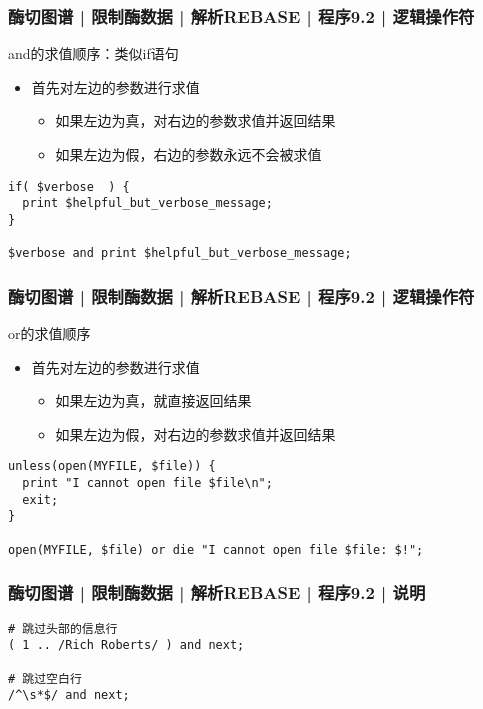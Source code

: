 \begin{frame}[fragile]
  \frametitle{酶切图谱 | 限制酶数据 | 解析REBASE | 程序9.2 | \alert{逻辑操作符}}
  \begin{block}{and的求值顺序：类似if语句}
    \begin{itemize}
      \item 首先对左边的参数进行求值
	\begin{itemize}
	  \item 如果左边为真，对右边的参数求值并返回结果
	  \item 如果左边为假，右边的参数永远不会被求值
	\end{itemize}
    \end{itemize}
  \end{block}
  \pause
  \vspace{-1.5em}
\begin{lstlisting}
if( $verbose  ) {
  print $helpful_but_verbose_message;
}

$verbose and print $helpful_but_verbose_message;
\end{lstlisting}
\end{frame}

\begin{frame}[fragile]
  \frametitle{酶切图谱 | 限制酶数据 | 解析REBASE | 程序9.2 | \alert{逻辑操作符}}
  \begin{block}{or的求值顺序}
    \begin{itemize}
      \item 首先对左边的参数进行求值
	\begin{itemize}
	  \item 如果左边为真，就直接返回结果
	  \item 如果左边为假，对右边的参数求值并返回结果
	\end{itemize}
    \end{itemize}
  \end{block}
  \pause
  \vspace{-1.5em}
\begin{lstlisting}
unless(open(MYFILE, $file)) {
  print "I cannot open file $file\n";
  exit;
}

open(MYFILE, $file) or die "I cannot open file $file: $!";
\end{lstlisting}
\end{frame}

\begin{frame}[fragile]
  \frametitle{酶切图谱 | 限制酶数据 | 解析REBASE | 程序9.2 | 说明}
  \vspace{-1.5em}
\begin{lstlisting}
# 跳过头部的信息行
( 1 .. /Rich Roberts/ ) and next;

# 跳过空白行
/^\s*$/ and next;
\end{lstlisting}
\end{frame}

